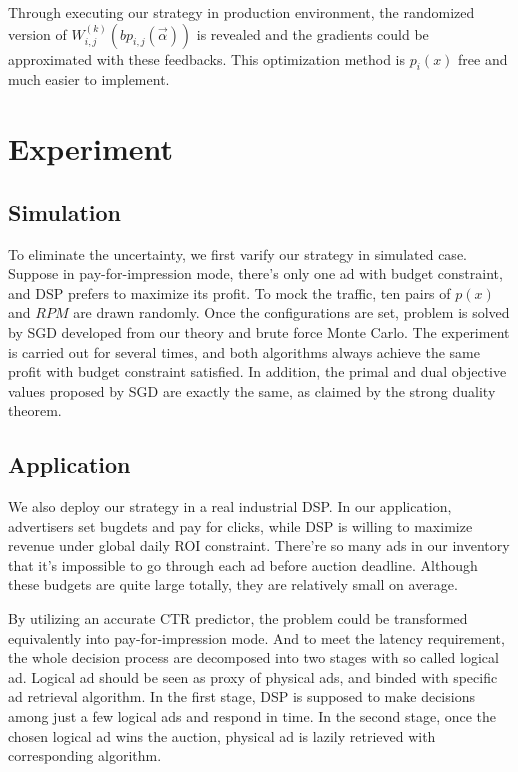\documentclass{article}
\theoremstyle{definition}
\newcommand{\sbp}{bp_{i,j}}
\newcommand{\sW}{W_{i,j}^{(k)}}
\newcommand{\valpha}{\vec{\alpha}}
\begin{document}
\begin{CJK}{UTF8}{gbsn}
Through executing our strategy in production environment, the randomized version of $\sW(\sbp(\valpha))$ is revealed
    and the gradients could be approximated with these feedbacks.
This optimization method is $p_i(x)$ free and much easier to implement.

\newpage
\section{Experiment}

\subsection{Simulation}

To eliminate the uncertainty, we first varify our strategy in simulated case.
Suppose in pay-for-impression mode, there's only one ad with budget constraint, and DSP prefers to maximize its profit.
To mock the traffic, ten pairs of $p(x)$ and $RPM$ are drawn randomly.
Once the configurations are set, problem is solved by SGD developed from our theory and brute force Monte Carlo.
The experiment is carried out for several times, and both algorithms always achieve the same profit with budget constraint satisfied.
In addition, the primal and dual objective values proposed by SGD are exactly the same, as claimed by the strong duality theorem.

\subsection{Application}

We also deploy our strategy in a real industrial DSP.
In our application, advertisers set bugdets and pay for clicks, while DSP is willing to maximize revenue under global daily ROI constraint.
There're so many ads in our inventory that it's impossible to go through each ad before auction deadline.
Although these budgets are quite large totally, they are relatively small on average.

By utilizing an accurate CTR predictor, the problem could be transformed equivalently into pay-for-impression mode.
And to meet the latency requirement, the whole decision process are decomposed into two stages with so called logical ad.
Logical ad should be seen as proxy of physical ads, and binded with specific ad retrieval algorithm.
In the first stage, DSP is supposed to make decisions among just a few logical ads and respond in time.
In the second stage, once the chosen logical ad wins the auction, physical ad is lazily retrieved with corresponding algorithm.


\end{CJK}
\end{document}
